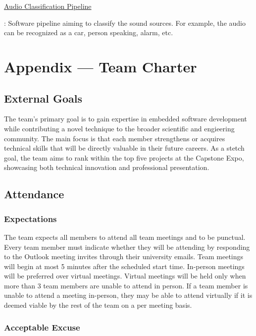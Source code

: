 \documentclass{article}
\begin{document}
\hypertarget{audio_classification_pipeline}{\underline{Audio Classification Pipeline}}: 
Software pipeline aiming to classify the sound sources.
For example, the audio can be recognized as a car, person speaking, alarm, etc.

\newpage{}

\section*{Appendix --- Team Charter}

\subsection*{External Goals}

The team's primary goal is to gain expertise in embedded software development while contributing a novel technique to the broader scientific and engieering community.
The main focus is that each member strengthens or acquires technical skills that will be directly valuable in their future careers.
As a stetch goal, the team aims to rank within the top five projects at the Capstone Expo, showcasing both technical innovation and professional presentation.

\subsection*{Attendance}

\subsubsection*{Expectations}

The team expects all members to attend all team meetings and to be punctual. Every team member must indicate whether they will be attending 
by responding to the Outlook meeting invites through their university emails. Team meetings 
will begin at most 5 minutes after the scheduled start time. In-person meetings will be preferred over virtual meetings.
Virtual meetings will be held only when more than 3 team members are unable to attend in person. If a team member is unable to 
attend a meeting in-person, they may be able to attend virtually if it is deemed viable by the rest of the team on a per meeting basis.

\subsubsection*{Acceptable Excuse}
\end{document}
